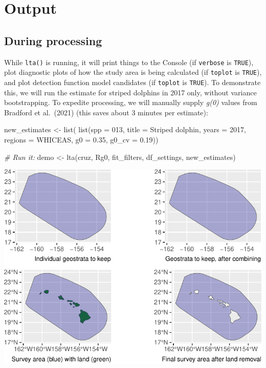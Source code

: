 \documentclass[
]{book}
\newenvironment{Shaded}{\begin{snugshade}}{\end{snugshade}}
\newcommand{\AttributeTok}[1]{\textcolor[rgb]{0.77,0.63,0.00}{#1}}
\newcommand{\CommentTok}[1]{\textcolor[rgb]{0.56,0.35,0.01}{\textit{#1}}}
\newcommand{\DecValTok}[1]{\textcolor[rgb]{0.00,0.00,0.81}{#1}}
\newcommand{\FloatTok}[1]{\textcolor[rgb]{0.00,0.00,0.81}{#1}}
\newcommand{\FunctionTok}[1]{\textcolor[rgb]{0.00,0.00,0.00}{#1}}
\newcommand{\NormalTok}[1]{#1}
\newcommand{\OtherTok}[1]{\textcolor[rgb]{0.56,0.35,0.01}{#1}}
\newcommand{\StringTok}[1]{\textcolor[rgb]{0.31,0.60,0.02}{#1}}
\begin{document}
\hypertarget{output}{%
\section*{Output}\label{output}}

\hypertarget{during-processing}{%
\subsection*{During processing}\label{during-processing}}

While \texttt{lta()} is running, it will print things to the Console (if \texttt{verbose} is \texttt{TRUE}), plot diagnostic plots of how the study area is being calculated (if \texttt{toplot} is \texttt{TRUE}), and plot detection function model candidates (if \texttt{toplot} is \texttt{TRUE}). To demonstrate this, we will run the estimate for striped dolphins in 2017 only, without variance bootstrapping. To expedite processing, we will manually supply \emph{g(0)} values from Bradford et al.~(2021) (this saves about 3 minutes per estimate):

\begin{Shaded}
\begin{Highlighting}[]
\NormalTok{new\_estimates }\OtherTok{\textless{}{-}} \FunctionTok{list}\NormalTok{(}
    \FunctionTok{list}\NormalTok{(}\AttributeTok{spp =} \StringTok{\textquotesingle{}013\textquotesingle{}}\NormalTok{,}
         \AttributeTok{title =} \StringTok{\textquotesingle{}Striped dolphin\textquotesingle{}}\NormalTok{,}
         \AttributeTok{years =} \DecValTok{2017}\NormalTok{,}
         \AttributeTok{regions =} \StringTok{\textquotesingle{}WHICEAS\textquotesingle{}}\NormalTok{,}
         \AttributeTok{g0 =} \FloatTok{0.35}\NormalTok{, }\AttributeTok{g0\_cv =} \FloatTok{0.19}\NormalTok{))}

\CommentTok{\# Run it:}
\NormalTok{demo }\OtherTok{\textless{}{-}} \FunctionTok{lta}\NormalTok{(cruz, Rg0, fit\_filters, df\_settings, new\_estimates)}
\end{Highlighting}
\end{Shaded}

\includegraphics{figures/unnamed-chunk-240-1.pdf}
\end{document}
